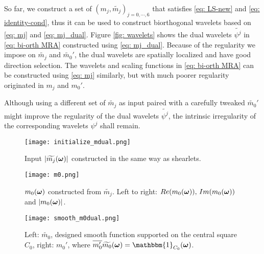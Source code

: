 So far, we construct a set of $(m_j,\widetilde{m_j})_{j = 0,\cdots,6}$ that satisfies \eqref{eq: LS-new} and \eqref{eq: identity-cond}, thus it can be used to construct biorthogonal wavelets based on \eqref{eq: mj} and \eqref{eq: mj_dual}. Figure \ref{fig: wavelets} shows the dual wavelets  $\widetilde{\psi^j}$ in \eqref{eq: bi-orth MRA} constructed using \eqref{eq: mj_dual}. Because of the regularity we impose on $\widetilde{m_j}$ and $\widetilde{m_0}'$, the dual wavelets are spatially localized and have good direction selection. The wavelets and scaling functions in \eqref{eq: bi-orth MRA} can be constructed using \eqref{eq: mj} similarly, but with much poorer regularity originated in $m_j$ and $m_0'$.

Although using a different set of $\widetilde{m_j}$ as input paired with a carefully tweaked $\widetilde{m_0}'$ might improve the regularity of the dual wavelets $\widetilde{\psi^j}$, the intrinsic irregularity of the corresponding wavelets $\psi^j$ shall remain.

\begin{figure}
\centering
\texttt{[image: initialize\_mdual.png]}
\caption{ Input $|\widetilde{m_{j}}(\boldsymbol{\omega})|$ constructed in the same way as shearlets.}
\label{fig: mjdual}
\end{figure}

\begin{figure}
\centering
\texttt{[image: m0.png]}
\caption{ $m_0(\boldsymbol{\omega})$ constructed from $\widetilde{m_j}$. Left to right: $Re(m_0(\boldsymbol{\omega})),\, Im(m_0(\boldsymbol{\omega}))$ and $|m_0(\boldsymbol{\omega})|$.}
\label{fig: m_0}
\end{figure}

\begin{figure}
\centering
\texttt{[image: smooth\_m0dual.png]}
\caption{Left: $\widetilde{m_0}$, designed smooth function supported on the central square $C_0$, right: $m_0'$, where %
$\overline{m_0'}\m{0} = \mathbbm{1}_{C_0}(\V{\omega})$.} 
\label{fig: smooth_m0dual}
\end{figure}

\begin{comment}
\begin{figure}
\centering
\texttt{[image: m0\_m0dual\_new.png]}
\caption{$|\m{0}|$ and $m_0\sbarm{0}$, where $\m{0}$ is solved by optimization \eqref{eq: opt}, given $\widetilde{m_j}$ in Figure \ref{fig: mjdual} and $m_0$ in Figure \ref{fig: m_0}. Left to right: $|\m{0}|$, $Re(m_0\sbarm{0})$ and $Im(m_0\sbarm{0})$. }
\label{fig: m_0_m0dual}
\end{figure}
\end{comment}

